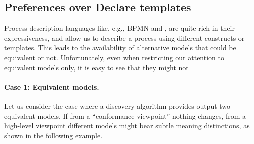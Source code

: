 \subsection{Preferences over Declare templates}
\label{subsec:prefOverTemplates}

Process description languages like, e.g., BPMN and \declare, are quite rich in their expressiveness, and allow us to describe a process using different constructs or templates. This leads to the availability of alternative models that could be equivalent or not. Unfortunately, even when restricting our attention to equivalent models only, it is easy to see that they might not 


\paragraph{Case 1: Equivalent models.} Let us consider  the %
 case where a discovery algorithm provides  %
 output two equivalent models. If from a ``conformance viewpoint'' nothing changes, from a high-level viewpoint different models might bear subtle meaning distinctions, as shown in the following example.

